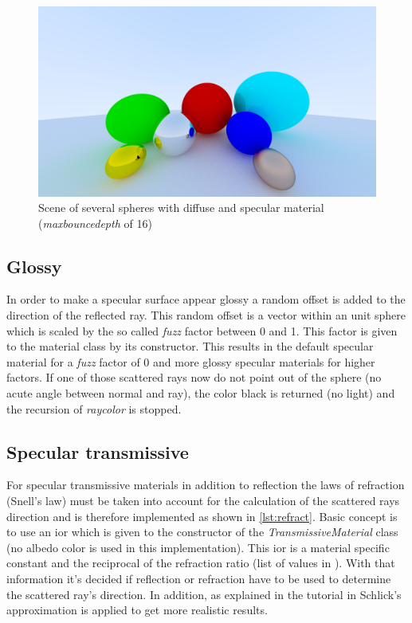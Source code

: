 \documentclass[]{article}
\begin{document}
		\begin{figure}[h]
			\centering
			\includegraphics[width=0.9\linewidth]{image6-5}
			\caption{Scene of several spheres with diffuse and specular material (\emph{max\textunderscore bounce\textunderscore depth} of 16)}
			\label{fig:image6}
		\end{figure}
	
		\subsection{Glossy}
		\label{sec:glossy}
		In order to make a specular surface appear glossy a random offset is added to the direction of the reflected ray. This random offset is a vector within an unit sphere which is scaled by the so called \emph{fuzz} factor between 0 and 1. This factor is given to the material class by its constructor. This results in the default specular material for a \emph{fuzz} factor of 0 and more glossy specular materials for higher factors. If one of those scattered rays now do not point out of the sphere (no acute angle between normal and ray), the color black is returned (no light) and the recursion of \emph{ray\textunderscore color} is stopped.
	
		\subsection{Specular transmissive}
		For specular transmissive materials in addition to reflection the laws of refraction (Snell's law) must be taken into account for the calculation of the scattered rays direction and is therefore implemented as shown in \cref{lst:refract}. Basic concept is to use an \ac{ior} which is given to the constructor of the \emph{TransmissiveMaterial} class (no albedo color is used in this implementation). This \ac{ior} is a material specific constant and the reciprocal of the refraction ratio (list of values in \cite{IOR}). With that information it's decided if reflection or refraction have to be used to determine the scattered ray's direction. In addition, as explained in the tutorial in \cite{Shirley2020RTW1} Schlick's approximation is applied to get more realistic results.
		
\end{document}
